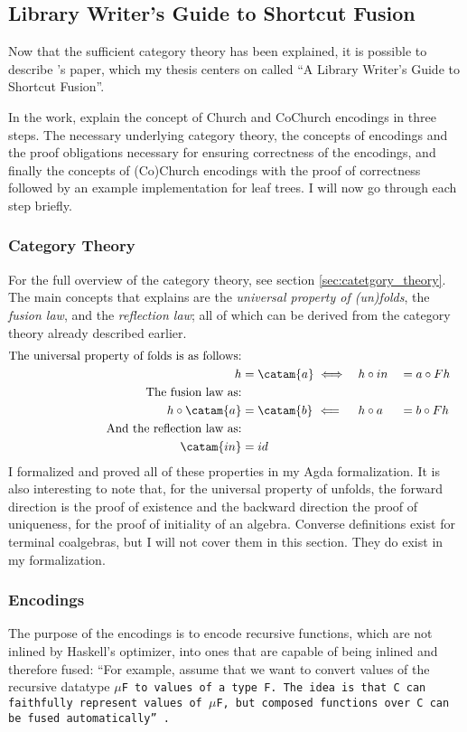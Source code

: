 
\subsection{Library Writer's Guide to Shortcut Fusion}
Now that the sufficient category theory has been explained, it is possible to describe \cite{Harper2011}'s paper, which my thesis centers on called ``A Library Writer's Guide to Shortcut Fusion''.

In the work, \cite{Harper2011} explain the concept of Church and CoChurch encodings in three steps.
The necessary underlying category theory, the concepts of encodings and the proof obligations necessary for ensuring correctness of the encodings, and finally the concepts of (Co)Church encodings with the proof of correctness followed by an example implementation for leaf trees.
I will now go through each step briefly.

\subsubsection{Category Theory}
For the full overview of the category theory, see section \ref{sec:catetgory_theory}.
The main concepts that \cite{Harper2011} explains are the \textit{universal property of (un)folds}, the \textit{fusion law}, and the \textit{reflection law}; all of which can be derived from the category theory already described earlier.
\begin{alignat*}{3}
\text{The universal property of folds is as follows:} \\
h &= \catam{a} \iff && h \circ in &&= a \circ F h \\
\text{The fusion law as:} \\
h \circ \catam{a} &= \catam{b}~\Longleftarrow && h \circ a &&= b \circ F h \\
\text{And the reflection law as:} \\
\catam{in} &= id
\end{alignat*}
I formalized and proved all of these properties in my Agda formalization.
It is also interesting to note that, for the universal property of unfolds, the forward direction is the proof of existence and the backward direction the proof of uniqueness, for the proof of initiality of an algebra.
Converse definitions exist for terminal coalgebras, but I will not cover them in this section.
They do exist in my formalization.

\subsubsection{Encodings}
The purpose of the encodings is to encode recursive functions, which are not inlined by Haskell's optimizer, into ones that are capable of being inlined and therefore fused:
``For example, assume that we want to convert values of the recursive datatype \tt{$\mu$F} to values of a type \tt{F}.  The idea is that \tt{C} can faithfully represent values of \tt{$\mu$F}, but composed functions over \tt{C} can be fused automatically'' \citep{Harper2011}.

